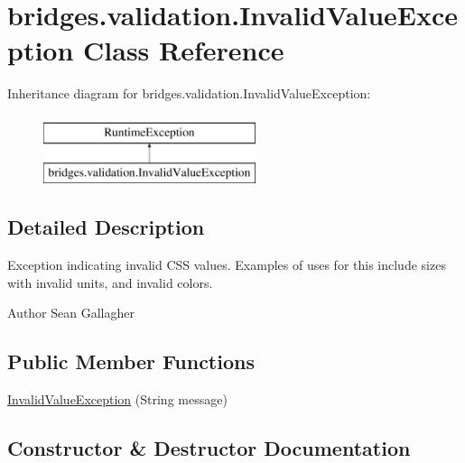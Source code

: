 \hypertarget{classbridges_1_1validation_1_1_invalid_value_exception}{}\section{bridges.\+validation.\+Invalid\+Value\+Exception Class Reference}
\label{classbridges_1_1validation_1_1_invalid_value_exception}
Inheritance diagram for bridges.\+validation.\+Invalid\+Value\+Exception\+:\begin{figure}[H]
\begin{center}
\leavevmode
\includegraphics[height=2.000000cm]{classbridges_1_1validation_1_1_invalid_value_exception}
\end{center}
\end{figure}


\subsection{Detailed Description}
Exception indicating invalid C\+SS values. Examples of uses for this include sizes with invalid units, and invalid colors. \begin{DoxyAuthor}{Author}
Sean Gallagher 
\end{DoxyAuthor}
\subsection*{Public Member Functions}
\begin{DoxyCompactItemize}
\item 
\hyperlink{classbridges_1_1validation_1_1_invalid_value_exception_adf4c16bcef674454b87d8cc035efc75d}{Invalid\+Value\+Exception} (String message)
\end{DoxyCompactItemize}


\subsection{Constructor \& Destructor Documentation}
\mbox{\label{classbridges_1_1validation_1_1_invalid_value_exception_adf4c16bcef674454b87d8cc035efc75d}} 
